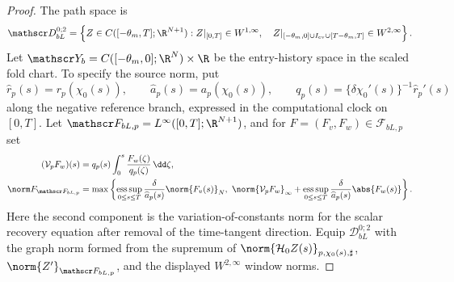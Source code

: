 \begin{proof}
The path space is
\begin{equation}
 \mathscr D_{bL}^{0;2}
 =\left\{Z\in C([ -\theta_m,T];\R^{N+1}):
 Z|_{[0,T]}\in W^{1,\infty},\quad
 Z|_{[-\theta_m,0]\cup I_{\rm ev}\cup[T-\theta_m,T]}
       \in W^{2,\infty}\right\}.
 \label{eq:supp-mixed-path-space}
\end{equation}
Let \(\mathscr Y_b=C([ -\theta_m,0];\R^N)\times\R\) be the entry-history
space in the scaled fold chart.  To specify the source norm, put
\[
 \widehat r_p(s)=r_p(\chi_0(s)),\qquad
 \widehat a_p(s)=a_p(\chi_0(s)),\qquad
 q_p(s)=\{\delta\chi_0'(s)\}^{-1}\widehat r_p'(s)
\]
along the negative reference branch, expressed in the computational clock on
\([0,T]\).  Let
\(\mathscr F_{bL,p}=L^\infty([0,T];\R^{N+1})\), and for
\(F=(F_v,F_w)\in\mathscr F_{bL,p}\) set
\begin{align}
 (\mathcal V_pF_w)(s)
 &=q_p(s)\int_0^s\frac{F_w(\zeta)}{q_p(\zeta)}\,\dd\zeta,\notag\\
 \norm F_{\mathscr F_{bL,p}}
 &=\max\left\{
   \operatorname*{ess\,sup}_{0\le s\le T}
        \frac{\delta}{\widehat a_p(s)}\norm{F_v(s)}_N,\
   \norm{\mathcal V_pF_w}_\infty
   +\operatorname*{ess\,sup}_{0\le s\le T}
        \frac{\delta}{\widehat a_p(s)}\abs{F_w(s)}\right\}.
 \label{eq:supp-mixed-source-norm}
\end{align}
Here the second component is the variation-of-constants norm for the scalar
recovery equation after removal of the time-tangent direction.  Equip
\(\mathscr D_{bL}^{0;2}\) with the graph norm formed from the supremum of
\(\norm{\mathcal H_0Z(s)}_{p,\chi_0(s),\sharp}\),
\(\norm{Z'}_{\mathscr F_{bL,p}}\), and the displayed
\(W^{2,\infty}\) window norms.


\end{proof}

